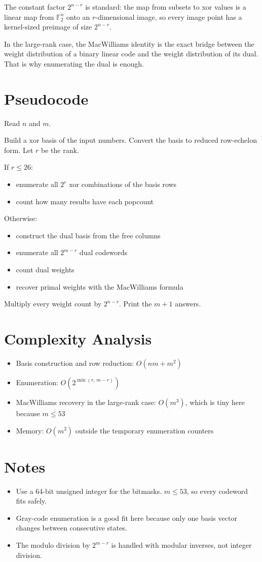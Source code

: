 The constant factor \(2^{n-r}\) is standard: the map from subsets to xor values is a linear map from \(\mathbb{F}_2^n\) onto an \(r\)-dimensional image, so every image point has a kernel-sized preimage of size \(2^{n-r}\).

In the large-rank case, the MacWilliams identity is the exact bridge between the weight distribution of a binary linear code and the weight distribution of its dual. That is why enumerating the dual is enough.

\section{Pseudocode}
Read \(n\) and \(m\).

Build a xor basis of the input numbers.
Convert the basis to reduced row-echelon form.
Let \(r\) be the rank.

If \(r \le 26\):
\begin{itemize}
\item enumerate all \(2^r\) xor combinations of the basis rows
\item count how many results have each popcount
\end{itemize}

Otherwise:
\begin{itemize}
\item construct the dual basis from the free columns
\item enumerate all \(2^{m-r}\) dual codewords
\item count dual weights
\item recover primal weights with the MacWilliams formula
\end{itemize}

Multiply every weight count by \(2^{n-r}\).
Print the \(m+1\) answers.

\section{Complexity Analysis}
\begin{itemize}
\item Basis construction and row reduction: \(O(nm + m^2)\)
\item Enumeration: \(O(2^{\min(r,\,m-r)})\)
\item MacWilliams recovery in the large-rank case: \(O(m^3)\), which is tiny here because \(m \le 53\)
\item Memory: \(O(m^2)\) outside the temporary enumeration counters
\end{itemize}

\section{Notes}
\begin{itemize}
\item Use a 64-bit unsigned integer for the bitmasks. \(m \le 53\), so every codeword fits safely.
\item Gray-code enumeration is a good fit here because only one basis vector changes between consecutive states.
\item The modulo division by \(2^{m-r}\) is handled with modular inverses, not integer division.
\end{itemize}
